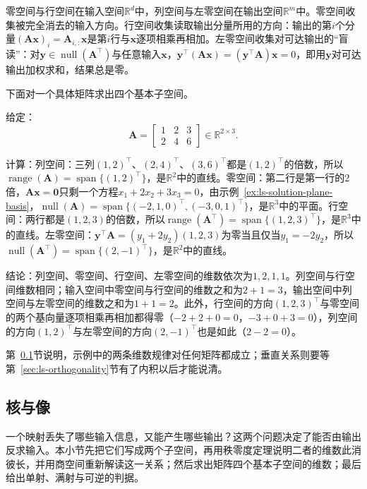 零空间与行空间在输入空间$\mathbb R^d$中，列空间与左零空间在输出空间$\mathbb R^m$中。零空间收集被完全消去的输入方向。行空间收集读取输出分量所用的方向：输出的第$i$个分量$(\bm A\bm x)_i=\bm A_{i,:}\bm x$是第$i$行与$\bm x$逐项相乘再相加。左零空间收集对可达输出的“盲读”：对$\bm y\in\operatorname{null}(\bm A^\top)$与任意输入$\bm x$，$\bm y^\top(\bm A\bm x)=(\bm y^\top\bm A)\bm x=0$，即用$\bm y$对可达输出加权求和，结果总是零。

下面对一个具体矩阵求出四个基本子空间。
\begin{example}
\label{ex:ls-rank-one-four-subspaces}
给定：
\[
 \bm A=\begin{bmatrix}1&2&3\\2&4&6\end{bmatrix}\in\mathbb R^{2\times3}.
\]

计算：列空间：三列$(1,2)^\top$、$(2,4)^\top$、$(3,6)^\top$都是$(1,2)^\top$的倍数，所以$\operatorname{range}(\bm A)=\operatorname{span}\{(1,2)^\top\}$，是$\mathbb R^2$中的直线。零空间：第二行是第一行的$2$倍，$\bm A\bm x=\bm0$只剩一个方程$x_1+2x_2+3x_3=0$，由示例~\ref{ex:ls-solution-plane-basis}，$\operatorname{null}(\bm A)=\operatorname{span}\{(-2,1,0)^\top,(-3,0,1)^\top\}$，是$\mathbb R^3$中的平面。行空间：两行都是$(1,2,3)$的倍数，所以$\operatorname{range}(\bm A^\top)=\operatorname{span}\{(1,2,3)^\top\}$，是$\mathbb R^3$中的直线。左零空间：$\bm y^\top\bm A=(y_1+2y_2)(1,2,3)$为零当且仅当$y_1=-2y_2$，所以$\operatorname{null}(\bm A^\top)=\operatorname{span}\{(2,-1)^\top\}$，是$\mathbb R^2$中的直线。

结论：列空间、零空间、行空间、左零空间的维数依次为$1,2,1,1$。列空间与行空间维数相同；输入空间中零空间与行空间的维数之和为$2+1=3$，输出空间中列空间与左零空间的维数之和为$1+1=2$。此外，行空间的方向$(1,2,3)^\top$与零空间的两个基向量逐项相乘再相加都得零（$-2+2+0=0$，$-3+0+3=0$），列空间的方向$(1,2)^\top$与左零空间的方向$(2,-1)^\top$也是如此（$2-2=0$）。
\end{example}
第~\ref{sec:ls-kernel-image}节说明，示例中的两条维数规律对任何矩阵都成立；垂直关系则要等第~\ref{sec:ls-orthogonality}节有了内积以后才能说清。

\subsection{核与像}
\label{sec:ls-kernel-image}

一个映射丢失了哪些输入信息，又能产生哪些输出？这两个问题决定了能否由输出反求输入。本小节先把它们写成两个子空间，再用秩零度定理说明二者的维数此消彼长，并用商空间重新解读这一关系；然后求出矩阵四个基本子空间的维数；最后给出单射、满射与可逆的判据。

